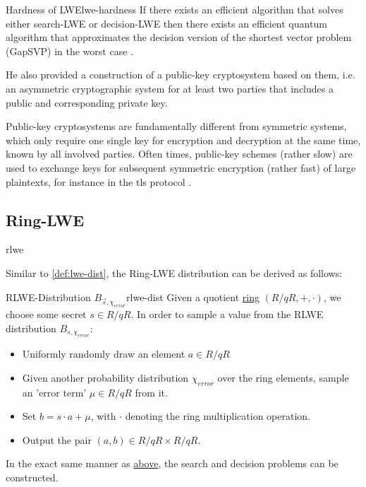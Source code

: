 \begin{theorem}{Hardness of LWE}{lwe-hardness}
  If there exists an efficient algorithm that solves either search-LWE or decision-LWE then
  there exists an efficient quantum algorithm that approximates the decision
  version of the shortest vector problem (GapSVP) in the worst case \parencite{2010-lwe-survey}.
\end{theorem}

He also provided a construction of a public-key cryptosystem based on them, i.e. an asymmetric cryptographic
system for at least two parties that includes a public and corresponding private key.

Public-key cryptosystems are fundamentally different from symmetric systems, which only
require one single key for encryption and decryption at the same time, known by all involved parties.
Often times, public-key schemes (rather slow) are used to exchange keys for subsequent symmetric encryption
(rather fast) of large plaintexts, for instance in the \gls{tls} protocol \parencite{rfc8446}.

\subsection{Ring-LWE}
\Gls{rlwe}
\cite{2010-rlwe-original}

Similar to \autoref{def:lwe-dist}, the Ring-LWE distribution can be derived as follows:

\begin{corollary}{RLWE-Distribution $B_{\vec{s}, \chi_{error}}$}{rlwe-dist}
  Given a quotient \hyperref[def:ring]{ring} $(R/qR, +, \cdot)$, we choose some secret $s \in R/qR$.
  In order to sample a value from the RLWE distribution $B_{s, \chi_{error}}$:
  \begin{itemize}
    \item Uniformly randomly draw an element $a \in R/qR$
    \item Given another probability distribution $\chi_{error}$ over the ring elements,
          sample an 'error term' $\mu \in R/qR$ from it.
    \item Set $b = s \cdot a + \mu$, with $\cdot$ denoting the ring multiplication operation.
    \item Output the pair $(a, b) \in R/qR \times R/qR$.
  \end{itemize}
\end{corollary}

In the exact same manner as \hyperref[subsec:lwe]{above}, the search and decision problems
can be constructed.

